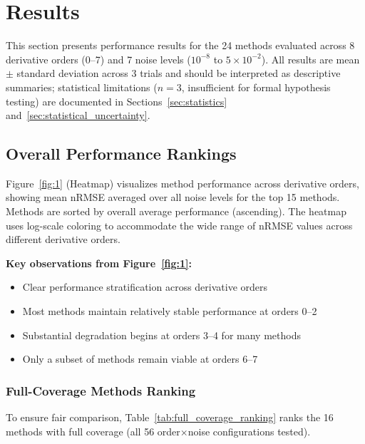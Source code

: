 \section{Results}
\label{sec:results}

This section presents performance results for the 24 methods evaluated across 8 derivative orders (0--7) and 7 noise levels ($10^{-8}$ to $5 \times 10^{-2}$). All results are mean $\pm$ standard deviation across 3 trials and should be interpreted as descriptive summaries; statistical limitations ($n=3$, insufficient for formal hypothesis testing) are documented in Sections~\ref{sec:statistics} and~\ref{sec:statistical_uncertainty}.

\subsection{Overall Performance Rankings}
\label{sec:overall_rankings}

Figure~\ref{fig:1} (Heatmap) visualizes method performance across derivative orders, showing mean nRMSE averaged over all noise levels for the top 15 methods. Methods are sorted by overall average performance (ascending). The heatmap uses log-scale coloring to accommodate the wide range of nRMSE values across different derivative orders.

\textbf{Key observations from Figure~\ref{fig:1}:}
\begin{itemize}
    \item Clear performance stratification across derivative orders
    \item Most methods maintain relatively stable performance at orders 0--2
    \item Substantial degradation begins at orders 3--4 for many methods
    \item Only a subset of methods remain viable at orders 6--7
\end{itemize}

\subsubsection{Full-Coverage Methods Ranking}

To ensure fair comparison, Table~\ref{tab:full_coverage_ranking} ranks the 16 methods with full coverage (all 56 order$\times$noise configurations tested).

